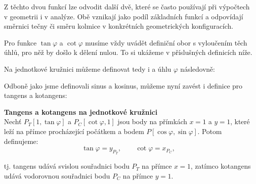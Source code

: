 \documentclass[12pt,a4paper]{article}
\begin{document}
Z těchto dvou funkcí lze odvodit další dvě, které se často používají při výpočtech v geometrii i v 
analýze. Obě vznikají jako podíl základních funkcí a odpovídají směrnici tečny či směru kolmice v 
konkrétních geometrických konfiguracích.

\begin{notebox}
Pro funkce $\tan\varphi$ a $\cot\varphi$ musíme vždy uvádět definiční obor s vyloučením těch úhlů, 
pro něž by došlo k dělení nulou. To si ukážeme v příslušných definicích níže.
\end{notebox}

Na jednotkové kružnici můžeme definovat tedy i  a  úhlu $\varphi$ následovně:
\begin{center}
\end{center}

Odboně jako jsme definovali sinus a kosinus, můžeme nyní zavést i definice pro tangens a kotangens:
\begin{definitionbox}
    \textbf{Tangens a kotangens na jednotkové kružnici}\\
    Nechť $P_T[1,\tan\varphi]$ a $P_C[\cot\varphi,1]$ jsou body na přímkách $x=1$ a $y=1$,
    které leží na přímce procházející počátkem a bodem $P[\cos\varphi,\sin\varphi]$. Potom definujeme:
    \[
    \tan\varphi = y_{P_T}, \qquad
    \cot\varphi = x_{P_C},
    \]

    tj. tangens udává svislou souřadnici bodu $P_T$ na přímce $x=1$, zatímco kotangens udává vodorovnou souřadnici bodu $P_C$ na přímce $y=1$.
\end{definitionbox}
\end{document}
